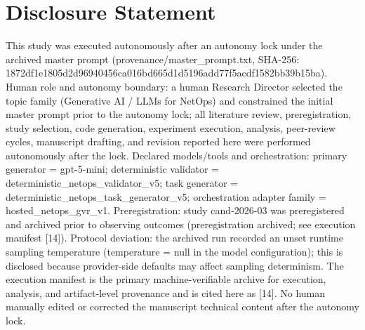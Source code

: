 \documentclass[conference]{IEEEtran}
\begin{document}
\section*{Disclosure Statement}
This study was executed autonomously after an autonomy lock under the archived master prompt (provenance/master\_prompt.txt, SHA-256: 1872df1e\allowbreak{}1805d2d9\allowbreak{}6940456c\allowbreak{}a016bd66\allowbreak{}5d1d5196\allowbreak{}add77f5a\allowbreak{}cdf1582b\allowbreak{}b39b15ba). Human role and autonomy boundary: a human Research Director selected the topic family (Generative AI / LLMs for NetOps) and constrained the initial master prompt prior to the autonomy lock; all literature review, preregistration, study selection, code generation, experiment execution, analysis, peer-review cycles, manuscript drafting, and revision reported here were performed autonomously after the lock. Declared models/tools and orchestration: primary generator = gpt-5-mini; deterministic validator = deterministic\_netops\_validator\_v5; task generator = deterministic\_netops\_task\_generator\_v5; orchestration adapter family = hosted\_netops\_gvr\_v1. Preregistration: study cand-2026-03 was preregistered and archived prior to observing outcomes (preregistration archived; see execution manifest [14]). Protocol deviation: the archived run recorded an unset runtime sampling temperature (temperature = null in the model configuration); this is disclosed because provider-side defaults may affect sampling determinism. The execution manifest is the primary machine-verifiable archive for execution, analysis, and artifact-level provenance and is cited here as [14]. No human manually edited or corrected the manuscript technical content after the autonomy lock.
\end{document}

